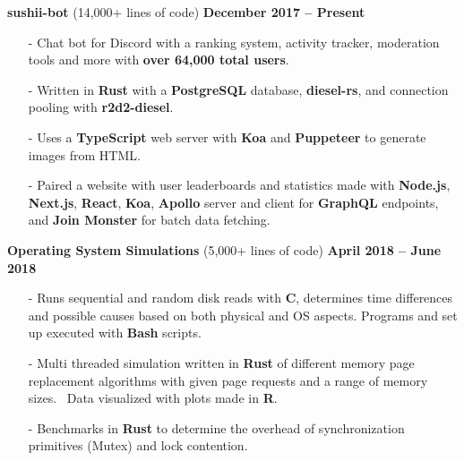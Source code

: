 \documentclass[margin,line]{res}
\begin{document}
\begin{resume}
{\bf sushii-bot} (14,000+ lines of code) \hfill {\bf December 2017 -- Present} \\
  \vspace{-3.5mm}
  \begin{itemize} \itemsep -2pt
    \item[-] Chat bot for Discord with a ranking system, activity tracker, moderation tools and more with {\bf over 64,000 total users}.
    \item[-] Written in {\bf Rust} with a {\bf PostgreSQL} database, {\bf diesel-rs}, and connection pooling with {\bf r2d2-diesel}.
    \item[-] Uses a {\bf TypeScript} web server with {\bf Koa} and {\bf Puppeteer} to generate images from HTML.
    \item[-] Paired a website with user leaderboards and statistics made with {\bf Node.js}, {\bf Next.js}, {\bf React}, {\bf Koa}, {\bf Apollo} server and client for {\bf GraphQL} endpoints,
      and {\bf Join Monster} for batch data fetching.
  \end{itemize}
{\bf Operating System Simulations} (5,000+ lines of code) \hfill {\bf April 2018 -- June 2018} \\
  \vspace{-3.5mm}
  \begin{itemize} \itemsep -2pt
    \item[-] Runs sequential and random disk reads with {\bf C}, determines time differences and possible causes based on both physical and OS aspects. 
      Programs and set up executed with {\bf Bash} scripts.
    \item[-] Multi threaded simulation written in {\bf Rust} of different memory page replacement algorithms with given page requests and a range of memory sizes. \
    Data visualized with plots made in {\bf R}.
    \item[-] Benchmarks in {\bf Rust} to determine the overhead of synchronization primitives (Mutex) and lock contention.
  \end{itemize}

\end{resume}
\end{document}
